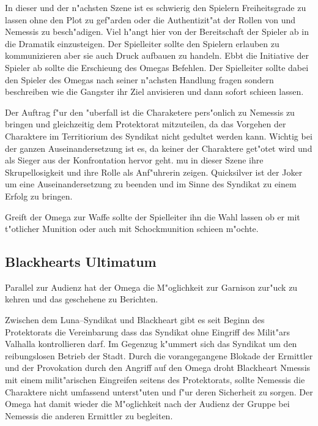 \begin{remarks}
	In dieser und der n"achsten Szene ist es schwierig den Spielern Freiheitsgrade zu lassen ohne den Plot zu gef"arden oder die Authentizit"at der Rollen von \xl{} und Nemessis zu besch"adigen. Viel h"angt hier von der Bereitschaft der Spieler ab in die Dramatik einzusteigen. Der Spielleiter sollte den Spielern erlauben zu kommunizieren aber sie auch Druck aufbauen zu handeln. Ebbt die Initiative der Spieler ab sollte \xl{} die Erschie\3ung des Omegas Befehlen. Der Spielleiter sollte dabei den Spieler des Omegas nach seiner n"achsten Handlung fragen sondern beschreiben wie die Gangster ihr Ziel anvisieren und dann sofort schie\3en lassen.

	Der Auftrag f"ur den "uberfall ist die Charaketere pers"onlich zu Nemessis zu bringen und gleichzeitig dem Protektorat mitzuteilen, da\3 das Vorgehen der Charaktere im Territiorium des Syndikat nicht gedultet werden kann. Wichtig bei der ganzen Auseinandersetzung ist es, da\3 keiner der Charaktere get"otet wird und \xl{} als Sieger aus der Konfrontation hervor geht. \xl{} mu\3 in dieser Szene ihre Skrupellosigkeit und ihre Rolle als Anf"uhrerin zeigen. Quicksilver ist der Joker um eine Auseinandersetzung zu beenden und im Sinne des Syndikat zu einem Erfolg zu bringen.

	Greift der Omega zur Waffe sollte der Spielleiter ihn die Wahl lassen ob er mit t"otlicher Munition oder auch mit Schockmunition schie\3en m"ochte.
\end{remarks}


\subsection{Blackhearts Ultimatum}

Parallel zur Audienz hat der Omega die M"oglichkeit zur Garnison zur"uck zu kehren und das geschehene zu Berichten. 

Zwischen dem Luna--Syndikat und Blackheart gibt es seit Beginn des Protektorats die Vereinbarung dass das Syndikat ohne Eingriff des Milit"ars Valhalla kontrollieren darf. Im Gegenzug k"ummert sich das Syndikat um den reibungslosen Betrieb der Stadt. Durch die  vorangegangene Blokade der Ermittler und der Provokation durch den Angriff auf den Omega droht Blackheart Nmessis mit einem milit"arischen Eingreifen seitens des Protektorats, sollte Nemessis die Charaktere nicht umfassend unterst"uten und f"ur deren Sicherheit zu sorgen. Der Omega hat damit wieder die M"oglichkeit nach der Audienz der Gruppe bei Nemessis die anderen Ermittler zu begleiten.


